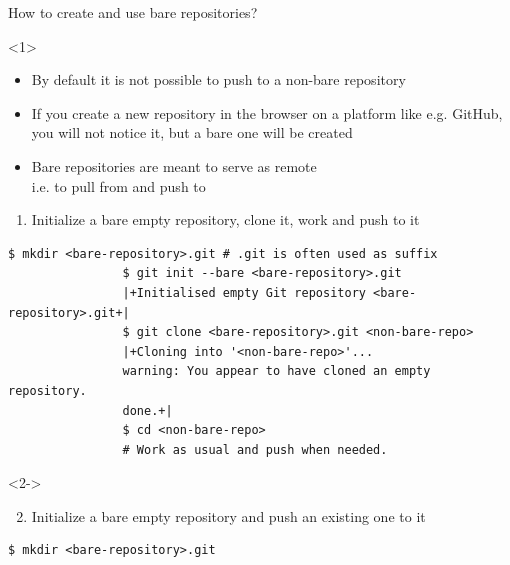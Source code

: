 \documentclass[usenames,svgnames,14pt]{beamer}
\newcommand{\then}{\raisebox{2pt}{$\;\drsh\;$}}
\begin{document}
\begin{frame}[fragile]{How to create and use bare repositories?}
    \setlength{\leftmarginii}{8mm}
    \begin{overlayarea}{\textwidth}{0.8\textheight}
        \begin{onlyenv}<1>
            \vspace{1mm}
            \begin{itemize}
                \item By default it is not possible to push to a non-bare repository
                \item If you create a new repository in the browser on a platform like e.g. GitHub, you will not notice it, but a bare one will be created
                \item \alert{Bare repositories are meant} to serve as remote\\ \then i.e. \alert{to pull from and push to}
            \end{itemize}
            \vspace{1mm}
            \begin{enumerate}
                \item Initialize a bare empty repository, clone it, work and push to it
            \end{enumerate}
            \begin{lstlisting}[style=MyBash]
                $ mkdir <bare-repository>.git # .git is often used as suffix
                $ git init --bare <bare-repository>.git
                |+Initialised empty Git repository <bare-repository>.git+|
                $ git clone <bare-repository>.git <non-bare-repo>
                |+Cloning into '<non-bare-repo>'...
                warning: You appear to have cloned an empty repository.
                done.+|
                $ cd <non-bare-repo>
                # Work as usual and push when needed.
            \end{lstlisting}
        \end{onlyenv}
        \begin{onlyenv}<2->
            \begin{enumerate}
                \setcounter{enumi}{1}
                \item Initialize a bare empty repository and push an existing one to it
            \end{enumerate}
            \begin{lstlisting}[style=MyBash]
                $ mkdir <bare-repository>.git

\end{lstlisting}
\end{onlyenv}
\end{overlayarea}
\end{frame}
\end{document}
